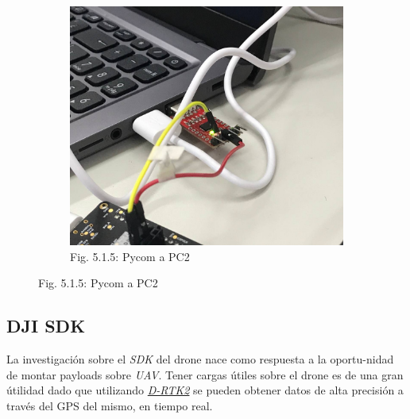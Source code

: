 \documentclass[12pt]{article}
\begin{document}
\begin{figure}[ht]
\begin{subfigure}[c]{0.45\linewidth}
    \includegraphics[width=\linewidth]{images/SMT32-PyCom-3.png}
    \caption{Fig. 5.1.5: Pycom a PC2}
  \end{subfigure}
\end{figure}

\subsection{DJI SDK}
La investigación sobre el \textit{SDK} del drone nace como respuesta a la oportu-nidad de montar payloads sobre \textit{UAV}. Tener cargas útiles sobre el drone es de una gran útilidad dado que utilizando \href{https://www.dji.com/d-rtk-2}{\textit{D-RTK2}} se pueden obtener datos de alta precisión a través del GPS del mismo, en tiempo real.
\end{document}
